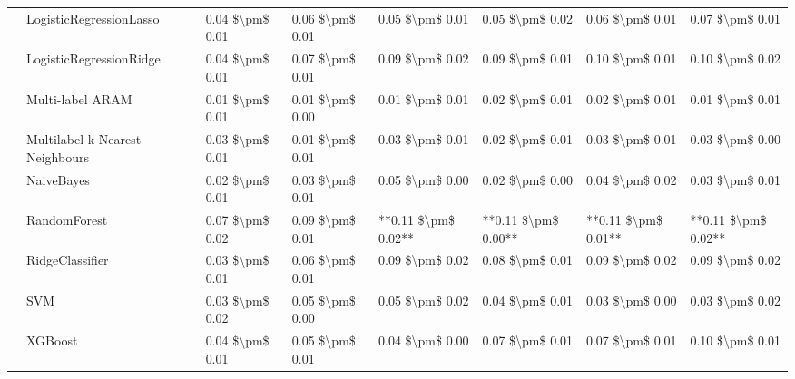 \begin{tabular}{llllllll}
   & LogisticRegressionLasso &  0.04 \$\textbackslash pm\$ 0.01 &           0.06 \$\textbackslash pm\$ 0.01 &       0.05 \$\textbackslash pm\$ 0.01 &        0.05 \$\textbackslash pm\$ 0.02 &                         0.06 \$\textbackslash pm\$ 0.01 &      0.07 \$\textbackslash pm\$ 0.01 \\
   & LogisticRegressionRidge &  0.04 \$\textbackslash pm\$ 0.01 &           0.07 \$\textbackslash pm\$ 0.01 &       0.09 \$\textbackslash pm\$ 0.02 &        0.09 \$\textbackslash pm\$ 0.01 &                         0.10 \$\textbackslash pm\$ 0.01 &      0.10 \$\textbackslash pm\$ 0.02 \\
   & Multi-label ARAM &  0.01 \$\textbackslash pm\$ 0.01 &           0.01 \$\textbackslash pm\$ 0.00 &       0.01 \$\textbackslash pm\$ 0.01 &        0.02 \$\textbackslash pm\$ 0.01 &                         0.02 \$\textbackslash pm\$ 0.01 &      0.01 \$\textbackslash pm\$ 0.01 \\
   & Multilabel k Nearest Neighbours &  0.03 \$\textbackslash pm\$ 0.01 &           0.01 \$\textbackslash pm\$ 0.01 &       0.03 \$\textbackslash pm\$ 0.01 &        0.02 \$\textbackslash pm\$ 0.01 &                         0.03 \$\textbackslash pm\$ 0.01 &      0.03 \$\textbackslash pm\$ 0.00 \\
   & NaiveBayes &  0.02 \$\textbackslash pm\$ 0.01 &           0.03 \$\textbackslash pm\$ 0.01 &       0.05 \$\textbackslash pm\$ 0.00 &        0.02 \$\textbackslash pm\$ 0.00 &                         0.04 \$\textbackslash pm\$ 0.02 &      0.03 \$\textbackslash pm\$ 0.01 \\
   & RandomForest &  0.07 \$\textbackslash pm\$ 0.02 &           0.09 \$\textbackslash pm\$ 0.01 &   **0.11 \$\textbackslash pm\$ 0.02** &    **0.11 \$\textbackslash pm\$ 0.00** &                     **0.11 \$\textbackslash pm\$ 0.01** &  **0.11 \$\textbackslash pm\$ 0.02** \\
   & RidgeClassifier &  0.03 \$\textbackslash pm\$ 0.01 &           0.06 \$\textbackslash pm\$ 0.01 &       0.09 \$\textbackslash pm\$ 0.02 &        0.08 \$\textbackslash pm\$ 0.01 &                         0.09 \$\textbackslash pm\$ 0.02 &      0.09 \$\textbackslash pm\$ 0.02 \\
   & SVM &  0.03 \$\textbackslash pm\$ 0.02 &           0.05 \$\textbackslash pm\$ 0.00 &       0.05 \$\textbackslash pm\$ 0.02 &        0.04 \$\textbackslash pm\$ 0.01 &                         0.03 \$\textbackslash pm\$ 0.00 &      0.03 \$\textbackslash pm\$ 0.02 \\
   & XGBoost &  0.04 \$\textbackslash pm\$ 0.01 &           0.05 \$\textbackslash pm\$ 0.01 &       0.04 \$\textbackslash pm\$ 0.00 &        0.07 \$\textbackslash pm\$ 0.01 &                         0.07 \$\textbackslash pm\$ 0.01 &      0.10 \$\textbackslash pm\$ 0.01 \\

\end{tabular}
